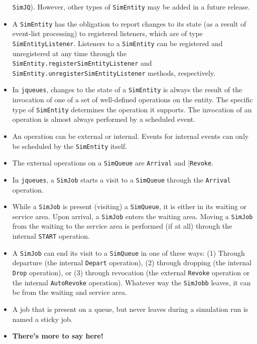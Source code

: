 \documentclass[12pt]{book}
\begin{document}
\begin{itemize}
          \lstinline|SimJQ|).
        However, other types of \lstinline|SimEntity| may be added in a future release.
  \item A \lstinline|SimEntity| has the obligation to report
          changes to its state (as a result of event-list processing)
          to registered listeners, which are of type \lstinline|SimEntityListener|.
        Listeners to a \lstinline|SimEntity| can be registered and
          unregistered at any time through the
          \lstinline|SimEntity.registerSimEntityListener|
          and \lstinline|SimEntity.unregisterSimEntityListener|
          methods, respectively.
  \item In \lstinline|jqueues|, changes to the state
          of a \lstinline|SimEntity| is always the result
          of the invocation of one of a set of well-defined
          operations on the entity.
        The specific type of \lstinline|SimEntity|
          determines the operation it supports.
        The invocation of an operation is
          almost always performed by a scheduled event.
  \item An operation can be external or internal.
        Events for internal events can only be scheduled
          by the \lstinline|SimEntity| itself.
  \item The external operations on a \lstinline|SimQueue| are
          \lstinline|Arrival| and |\lstinline|Revoke|.
  \item In \lstinline|jqueues|,
          a \lstinline|SimJob| starts a visit to a \lstinline|SimQueue|
          through the \lstinline|Arrival| operation.
  \item While a \lstinline|SimJob| is present (visiting) a \lstinline|SimQueue|,
          it is either in its waiting or service area.
        Upon arrival, a \lstinline|SimJob| enters the waiting area.
        Moving a \lstinline|SimJob| from the waiting to the service area
          is performed (if at all) through the internal \lstinline|START|
          operation.
  \item A \lstinline|SimJob| can end its visit to a \lstinline|SimQueue|
          in one of three ways: (1) Through departure
          (the internal \lstinline|Depart| operation), (2) through dropping
          (the internal \lstinline|Drop| operation), or (3) through revocation
          (the external \lstinline|Revoke| operation or the internal \lstinline|AutoRevoke| operation).
        Whatever way the \lstinline|SimJobb| leaves, it can be from the waiting
          and service area.
  \item A job that is present on a queue, but never leaves during a simulation run
          is named a sticky job.
  \item {\bf There's more to say here!}
\end{itemize}
\end{document}
